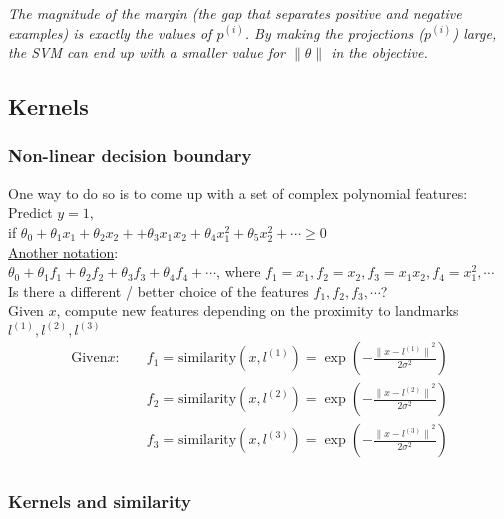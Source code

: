 \emph{\textcolor{Bittersweet}{The magnitude of the margin (the gap that separates positive and negative examples) is exactly the values of $p^{(i)}$. By making the projections ($p^{(i)}$) large, the SVM can end up with a smaller value for $\|\theta\|$ in the objective.}}

%
\subsection{Kernels}
\subsubsection{Non-linear decision boundary}

One way to do so is to come up with a set of complex polynomial features:\\

Predict $y=1$,\\
if $\theta_0 + \theta_1x_1 + \theta_2x_2 + + \theta_3x_1x_2 + \theta_4x_1^2 + \theta_5x_2^2 + \cdots \geq 0$\\

\underline{Another notation}:\\
$\theta_0 + \theta_1f_1 + \theta_2f_2 + \theta_3f_3 + \theta_4f_4 + \cdots$, where $f_1 = x_1, f_2 = x_2, f_3 = x_1x_2, f_4 = x_1^2, \cdots$\\

Is there a different / better choice of the features $f_1, f_2, f_3, \cdots$?\\
Given $x$, compute new features depending on the proximity to landmarks $l^{(1)}, l^{(2)}, l^{(3)}$\\
\begin{align*}
\text{Given} x: \quad 
& f_1 = \text{similarity}(x, l^{(1)})=\exp{\left(-\frac{{\|x-l^{(1)}\|}^2}{2\sigma^2}\right)}\\
& f_2 = \text{similarity}(x, l^{(2)})=\exp{\left(-\frac{{\|x-l^{(2)}\|}^2}{2\sigma^2}\right)}\\
& f_3 = \text{similarity}(x, l^{(3)})=\exp{\left(-\frac{{\|x-l^{(3)}\|}^2}{2\sigma^2}\right)}\\
\end{align*}

\subsubsection{Kernels and similarity}

